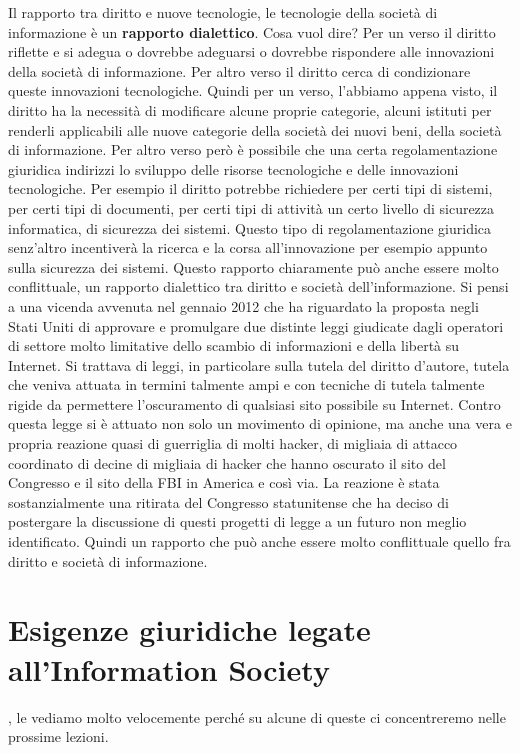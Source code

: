 Il rapporto tra diritto e nuove tecnologie, le tecnologie della società di informazione è un \textbf{rapporto dialettico}. Cosa vuol dire? Per un verso il diritto riflette e si adegua o dovrebbe adeguarsi o dovrebbe rispondere alle innovazioni della società di informazione. Per altro verso il diritto cerca di condizionare queste innovazioni tecnologiche. Quindi per un verso, l'abbiamo appena visto, il diritto ha la necessità di modificare alcune proprie categorie, alcuni istituti per renderli applicabili alle nuove categorie della società dei nuovi beni, della società di informazione. Per altro verso però è possibile che una certa regolamentazione giuridica indirizzi lo sviluppo delle risorse tecnologiche e delle innovazioni tecnologiche. Per esempio il diritto potrebbe richiedere per certi tipi di sistemi, per certi tipi di documenti, per certi tipi di attività un certo livello di sicurezza informatica, di sicurezza dei sistemi. Questo tipo di regolamentazione giuridica senz'altro incentiverà la ricerca e la corsa all'innovazione per esempio appunto sulla sicurezza dei sistemi. Questo rapporto chiaramente può anche essere molto conflittuale, un rapporto dialettico tra diritto e società dell'informazione. Si pensi a una vicenda avvenuta nel gennaio 2012 che ha riguardato la proposta negli Stati Uniti di approvare e promulgare due distinte leggi giudicate dagli operatori di settore molto limitative dello scambio di informazioni e della libertà su Internet. Si trattava di leggi, in particolare sulla tutela del diritto d'autore, tutela che veniva attuata in termini talmente ampi e con tecniche di tutela talmente rigide da permettere l'oscuramento di qualsiasi sito possibile su Internet. Contro questa legge si è attuato non solo un movimento di opinione, ma anche una vera e propria reazione quasi di guerriglia di molti hacker, di migliaia di attacco coordinato di decine di migliaia di hacker che hanno oscurato il sito del Congresso e il sito della FBI in America e così via. La reazione è stata sostanzialmente una ritirata del Congresso statunitense che ha deciso di postergare la discussione di questi progetti di legge a un futuro non meglio identificato. Quindi un rapporto che può anche essere molto conflittuale quello fra diritto e società di informazione.\par


\section{Esigenze giuridiche legate all'Information Society}, 
le vediamo molto velocemente perché su alcune di queste ci concentreremo nelle prossime lezioni. \par


